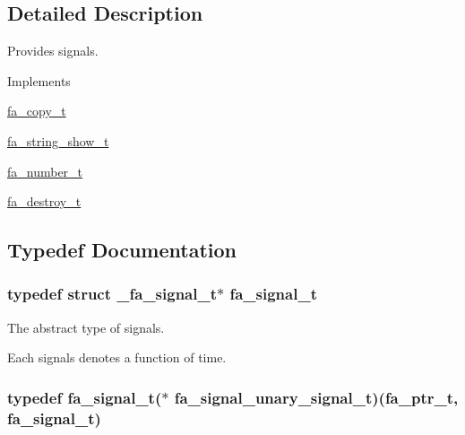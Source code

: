 \subsection{Detailed Description}
Provides signals. \begin{DoxyParagraph}{Implements}

\begin{DoxyItemize}
\item \hyperlink{structfa__copy__t}{fa\-\_\-copy\-\_\-t}
\item \hyperlink{structfa__string__show__t}{fa\-\_\-string\-\_\-show\-\_\-t}
\item \hyperlink{structfa__number__t}{fa\-\_\-number\-\_\-t}
\item \hyperlink{structfa__destroy__t}{fa\-\_\-destroy\-\_\-t} 
\end{DoxyItemize}
\end{DoxyParagraph}


\subsection{Typedef Documentation}
\hypertarget{group___fa_signal_gac5c72f160cd6e93a6783551627b166e5}{
\subsubsection[{fa\-\_\-signal\-\_\-t}]{\setlength{\rightskip}{0pt plus 5cm}typedef struct \-\_\-fa\-\_\-signal\-\_\-t$\ast$ {\bf fa\-\_\-signal\-\_\-t}}}\label{group___fa_signal_gac5c72f160cd6e93a6783551627b166e5}


The abstract type of signals. 

Each signals denotes a function of time. \hypertarget{group___fa_signal_gaa1f5df5ce102da5b837ccfee4632c7b4}{
\subsubsection[{fa\-\_\-signal\-\_\-unary\-\_\-signal\-\_\-t}]{\setlength{\rightskip}{0pt plus 5cm}typedef {\bf fa\-\_\-signal\-\_\-t}($\ast$  fa\-\_\-signal\-\_\-unary\-\_\-signal\-\_\-t)({\bf fa\-\_\-ptr\-\_\-t}, {\bf fa\-\_\-signal\-\_\-t})}}\label{group___fa_signal_gaa1f5df5ce102da5b837ccfee4632c7b4}


